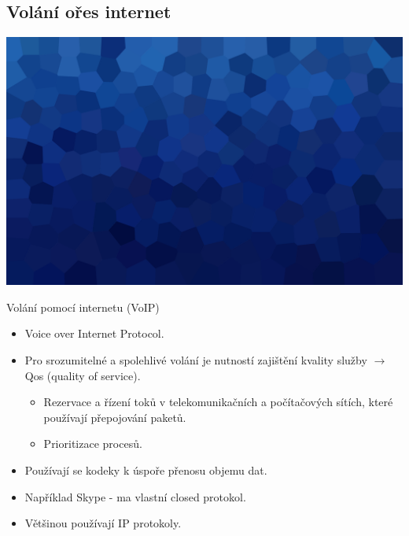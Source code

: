 \documentclass[aspectratio=169,xcolor=dvipsnames, t]{beamer}
\begin{document}
\subsection{Volání ořes internet}
{
    \includegraphics[width=\paperwidth,height=\paperheight]{AICStyleData/logos/mene_polygonu_bg.png}
}
\begin{frame}{Volání pomocí internetu (VoIP)}
    \begin{itemize}
        \item Voice over Internet Protocol.
        \item Pro srozumitelné a spolehlivé volání je nutností zajištění kvality služby $\rightarrow$ Qos (quality of service).
        \begin{itemize}
            \item Rezervace a řízení toků v  telekomunikačních a počítačových sítích, které používají přepojování paketů.
            \item Prioritizace procesů.
        \end{itemize}
        \item Používají se kodeky k úspoře přenosu objemu dat.
        \item Například Skype - ma vlastní closed protokol.
        \item Většinou používají IP protokoly.
    \end{itemize}

\end{frame}
\end{document}

